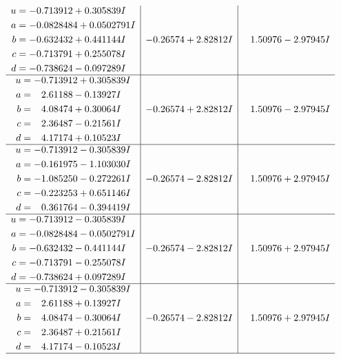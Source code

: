 \documentclass[1p]{elsarticle_modified}
\theoremstyle{definition}
\begin{document}
$$\begin{array}{c|c|c}
\begin{aligned}
u &= -0.713912 + 0.305839 I \\
a &= -0.0828484 + 0.0502791 I \\
b &= -0.632432 + 0.441144 I \\
c &= -0.713791 + 0.255078 I \\
d &= -0.738624 - 0.097289 I\end{aligned}
 & -0.26574 + 2.82812 I & \phantom{-}1.50976 - 2.97945 I \\ \hline\begin{aligned}
u &= -0.713912 + 0.305839 I \\
a &= \phantom{-}2.61188 - 0.13927 I \\
b &= \phantom{-}4.08474 + 0.30064 I \\
c &= \phantom{-}2.36487 - 0.21561 I \\
d &= \phantom{-}4.17174 + 0.10523 I\end{aligned}
 & -0.26574 + 2.82812 I & \phantom{-}1.50976 - 2.97945 I \\ \hline\begin{aligned}
u &= -0.713912 - 0.305839 I \\
a &= -0.161975 - 1.103030 I \\
b &= -1.085250 - 0.272261 I \\
c &= -0.223253 + 0.651146 I \\
d &= \phantom{-}0.361764 - 0.394419 I\end{aligned}
 & -0.26574 - 2.82812 I & \phantom{-}1.50976 + 2.97945 I \\ \hline\begin{aligned}
u &= -0.713912 - 0.305839 I \\
a &= -0.0828484 - 0.0502791 I \\
b &= -0.632432 - 0.441144 I \\
c &= -0.713791 - 0.255078 I \\
d &= -0.738624 + 0.097289 I\end{aligned}
 & -0.26574 - 2.82812 I & \phantom{-}1.50976 + 2.97945 I \\ \hline\begin{aligned}
u &= -0.713912 - 0.305839 I \\
a &= \phantom{-}2.61188 + 0.13927 I \\
b &= \phantom{-}4.08474 - 0.30064 I \\
c &= \phantom{-}2.36487 + 0.21561 I \\
d &= \phantom{-}4.17174 - 0.10523 I\end{aligned}
 & -0.26574 - 2.82812 I & \phantom{-}1.50976 + 2.97945 I\\
 \hline 
 \end{array}$$\newpage\newpage\renewcommand{\arraystretch}{1}
\end{document}
